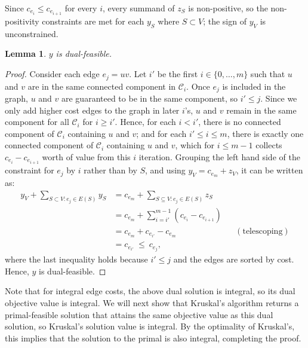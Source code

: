 \documentclass[11pt,letterpaper]{article}
\newtheorem{lemma}[theorem]{Lemma}
\theoremstyle{definition}
\newcommand{\calC}{\mathcal{C}}
\begin{document}
Since $c_{e_{i}}\leq c_{e_{i+1}}$ for every $i$, every summand of $z_S$ is non-positive, so the non-positivity constraints are met for each $y_S$ where $S\subset V$; the sign of $y_V$ is unconstrained.

\begin{lemma}
    $y$ is dual-feasible.
\end{lemma}
\begin{proof}
    Consider each edge $e_j =uv$. 
    Let $i'$ be the first $i\in\{0,\dots,m\}$ such that $u$ and $v$ are in the same connected component in $\calC_{i}$.
    Once $e_j$ is included in the graph, $u$ and $v$ are guaranteed to be in the same component, so $i'\leq j$.
    Since we only add higher cost edges to the graph in later $i$'s, $u$ and $v$ remain in the same component for all $\calC_{i}$ for $i\geq i'$.
    Hence, for each $i<i'$, there is no connected component of $\calC_i$ containing $u$ and $v$; and for each $i'\leq i\leq m$, there is exactly one connected component of $\calC_i$ containing $u$ and $v$, which for $i\leq m-1$ collects $c_{e_i} - c_{e_{i+1}} $ worth of value from this $i$ iteration.
    Grouping the left hand side of the constraint for $e_j$ by $i$ rather than by $S$, and using $y_V = c_{e_m}+z_V$, it can be written as:
    \begin{align*}
        y_V + \sum_{S\subset V:e_j\in E(S)} y_S &= c_{e_m} + \sum_{S\subseteq V:e_j\in E(S)} z_S \\
            &= c_{e_m} + \sum_{i=i'}^{m-1}\left(c_{e_{i}} - c_{e_{i+1}}\right) \\
         &= c_{e_m} + c_{e_{i'}} - c_{e_m} && (\text{telescoping}) \\
         &= c_{e_{i'}} \ \leq \ c_{e_j},
    \end{align*}
    where the last inequality holds because $i'\leq j$ and the edges are sorted by cost.
    Hence, $y$ is dual-feasible.
\end{proof}

Note that for integral edge costs, the above dual solution is integral, so its dual objective value is integral.
We will next show that Kruskal's algorithm returns a primal-feasible solution that attains the same objective value as this dual solution, so Kruskal's solution value is integral. 
By the optimality of Kruskal's, this implies that the solution to the primal is also integral, completing the proof.
\end{document}
